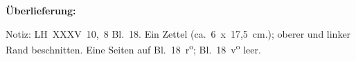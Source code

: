 %  
%
%
%
%   
%
%
%
%
%
%
%
%
\frenchspacing
%
\begin{ledgroupsized}[r]{120mm}
\footnotesize
\pstart
\noindent\textbf{Überlieferung:}
\pend
\end{ledgroupsized}
%
\begin{ledgroupsized}[r]{114mm}
\footnotesize
\pstart \parindent -6mm
%
Notiz:
LH~XXXV~10,~8 Bl.~18.
Ein Zettel (ca.~6~x~17,5~cm.);
oberer und linker Rand beschnitten.
Eine Seiten auf Bl.~18~r\textsuperscript{o}; Bl.~18~v\textsuperscript{o} leer.
\pend
\end{ledgroupsized}
%
%
\vspace{5mm}
